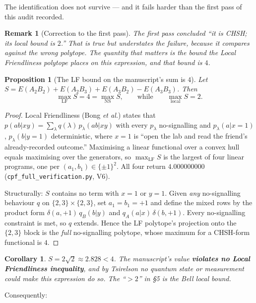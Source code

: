 \documentclass[11pt,a4paper]{article}
\newtheorem{proposition}{Proposition}
\newtheorem{corollary}{Corollary}
\newtheorem{remark}{Remark}
\begin{document}
The identification does not survive --- and it fails harder than the first pass of
this audit recorded.

\begin{remark}[Correction to the first pass]
\label{rem:lf-correction}
The first pass concluded ``it is CHSH; its local bound is $2$.'' That is true but
understates the failure, because it compares against the wrong polytope. The
quantity that matters is the bound the \emph{Local Friendliness} polytope places on
this expression, and that bound is $4$.
\end{remark}

\begin{proposition}[The LF bound on the manuscript's sum is $4$]
\label{prop:lf4}
Let $S = E(A_2B_2)+E(A_2B_3)+E(A_3B_2)-E(A_3B_3)$. Then
\[
\max_{\mathrm{LF}} S = 4 = \max_{\mathrm{NS}} S,
\qquad\text{while}\qquad \max_{\mathrm{local}} S = 2 .
\]
\end{proposition}

\begin{proof}
Local Friendliness (Bong \emph{et al.}) states that
$p(ab|xy)=\sum_\lambda q(\lambda)\,p_\lambda(ab|xy)$ with every $p_\lambda$
no-signalling and $p_\lambda(a|x{=}1)$, $p_\lambda(b|y{=}1)$ deterministic, where
$x=1$ is ``open the lab and read the friend's already-recorded outcome.'' Maximising
a linear functional over a convex hull equals maximising over the generators, so
$\max_{\mathrm{LF}}S$ is the largest of four linear programs, one per
$(a_1,b_1)\in\{\pm1\}^2$. All four return $4.000000000$
(\texttt{cpf\_full\_verification.py}, V6).

Structurally: $S$ contains no term with $x=1$ or $y=1$. Given \emph{any}
no-signalling behaviour $q$ on $\{2,3\}\times\{2,3\}$, set $a_1=b_1=+1$ and define
the mixed rows by the product form $\delta(a,+1)\,q_B(b|y)$ and
$q_A(a|x)\,\delta(b,+1)$. Every no-signalling constraint is met, so $q$ extends.
Hence the LF polytope's projection onto the $\{2,3\}$ block is the \emph{full}
no-signalling polytope, whose maximum for a CHSH-form functional is $4$.
\end{proof}

\begin{corollary}
$S = 2\sqrt2 \approx 2.828 < 4$. The manuscript's value \textbf{violates no Local
Friendliness inequality}, and by Tsirelson no quantum state or measurement could
make this expression do so. The ``$>2$'' in \S5 is the Bell local bound.
\end{corollary}

Consequently:
\end{document}
